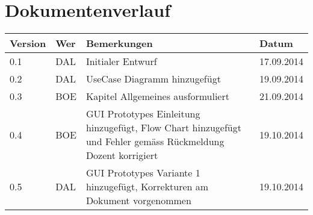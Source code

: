\newpage
\section*{Dokumentenverlauf}
\begin{center}
	\begin{tabular}{  llp{9cm}l }
		\textbf{Version} & \textbf{Wer} & \textbf{Bemerkungen} & \textbf{Datum} \\\hline
		0.1 & DAL & Initialer Entwurf & 17.09.2014 \\
		0.2 & DAL & UseCase Diagramm hinzugefügt & 19.09.2014 \\
		0.3 & BOE & Kapitel Allgemeines ausformuliert & 21.09.2014 \\
		0.4 & BOE & GUI Prototypes Einleitung hinzugefügt, Flow Chart hinzugefügt und Fehler gemäss Rückmeldung Dozent korrigiert & 19.10.2014 \\
		0.5 & DAL & GUI Prototypes Variante 1 hinzugefügt, Korrekturen am Dokument vorgenommen & 19.10.2014 \\
	\end{tabular}
\end{center}
\newpage